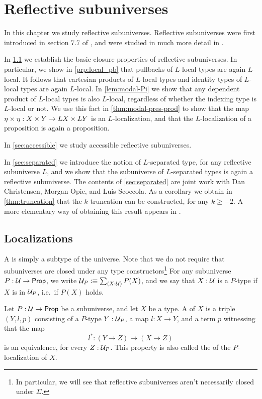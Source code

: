 \chapter{Reflective subuniverses}\label{chap:reflective}

In this chapter we study reflective subuniverses. Reflective subuniverses were first introduced in section 7.7 of \cite{hottbook}, and were studied in much more detail in \cite{RijkeShulmanSpitters}. 

In \cref{sec:prop-rfsu} we establish the basic closure properties of reflective subuniverses. In particular, we show in \cref{prp:local_pb} that pullbacks of $L$-local types are again $L$-local. It follows that cartesian products of $L$-local types and identity types of $L$-local types are again $L$-local. In \cref{lem:modal-Pi} we show that any dependent product of $L$-local types is also $L$-local, regardless of whether the indexing type is $L$-local or not. We use this fact in \cref{thm:modal-pres-prod} to show that the map ${\eta_{}}\times{\eta_{}}:X\times Y\to LX\times LY$ is an $L$-localization, and that the $L$-localization of a proposition is again a proposition.

In \cref{sec:accessible} we study accessible reflective subuniverses.

In \cref{sec:separated} we introduce the notion of $L$-separated type, for any reflective subuniverse $L$, and we show that the subuniverse of $L$-separated types is again a reflective subuniverse. The contents of \cref{sec:separated} are joint work with Dan Christensen, Morgan Opie, and Luis Scoccola. As a corollary we obtain in \cref{thm:truncation} that the $k$-truncation can be constructed, for any $k\geq -2$. A more elementary way of obtaining this result appears in \cite{joinconstruction}.

\section{Localizations}
\label{sec:prop-rfsu}

A  is simply a subtype of the universe. Note that we do not require that subuniverses are closed under any type constructors\footnote{In particular, we will see that reflective subuniverses aren't necessarily closed under $\Sigma$.}
For any subuniverse $P:\mathcal{U}\to\mathsf{Prop}$, we write $\UU_P\defeq \sm{X:\UU}P(X)$, and we say that $X:\mathcal{U}$ is a $P$-type if $X$ is in $\mathcal{U}_P$, i.e.~if $P(X)$ holds.

\begin{defn}
Let $P:\mathcal{U}\to\mathsf{Prop}$ be a subuniverse, and let $X$ be a type. A  of $X$ is a triple $(Y,l,p)$ consisting of a $P$-type $Y:\mathcal{U}_P$, a map $l:X\to Y$, and a term $p$ witnessing that the map
\begin{equation*}
l^\ast : (Y\to Z)\to (X\to Z)
\end{equation*}
is an equivalence, for every $Z:\mathcal{U}_P$. This property is also called the  of the $P$-localization of $X$.
\end{defn}

